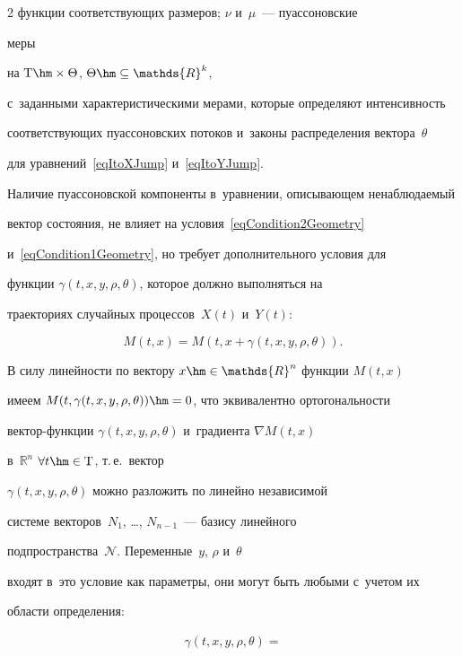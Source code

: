 \begin{multicols}{2}
функции соответствующих размеров; $\nu$ и~$\mu$~--- пуассоновские\linebreak

 меры 

на $\mathrm{T} \hm\times \Theta$, $\Theta \hm\subseteq \mathds{R}^k$, 

с~заданными характери\-сти\-че\-ски\-ми мерами, которые определяют интен\-сив\-ность 

со\-от\-вет\-ст\-ву\-ющих пуассоновских потоков и~законы распределения вектора~$\theta$ 

для уравнений~\eqref{eqItoXJump} и~\eqref{eqItoYJump}.



Наличие пуассоновской компоненты в~уравнении, описывающем ненаблюдаемый 

вектор состояния, не влияет на условия~\eqref{eqCondition2Geometry} 

и~\eqref{eqCondition1Geometry}, но требует дополнительного условия для 

функции $\gamma(t,x,y,\rho,\theta)$, которое должно выполняться на 

траекториях случайных процессов~$X(t)$ и~$Y(t)$:

$$

  M(t,x) = M \left( t,x + \gamma(t,x,y,\rho,\theta) \right).

$$



В силу линейности по вектору $x \hm\in \mathds{R}^n$ функции $M(t,x)$ 

имеем $M(t,\gamma(t,x,y,\rho,\theta))\hm = 0$, что эквивалентно ортогональности 

век\-тор-функ\-ции $\gamma(t,x,y,\rho,\theta)$ и~градиента $\nabla M(t,x)$ 

в~$\mathds{R}^n$ $\forall t \hm\in \mathrm{T}$, т.\,е.\ вектор 

$\gamma(t,x,y,\rho,\theta)$ можно разложить по линейно независимой 

системе векторов~$N_1$, \dots, $N_{n-1}$~--- базису линейного 

подпространства~$\mathcal{N}$. Переменные~$y$, $\rho$ и~$\theta$ 

входят в~это условие как параметры, они могут быть любыми с~учетом их 

области определения:

\begin{multline*}

  \gamma(t,x,y,\rho,\theta) ={}\\


\end{multline*}
\end{multicols}
